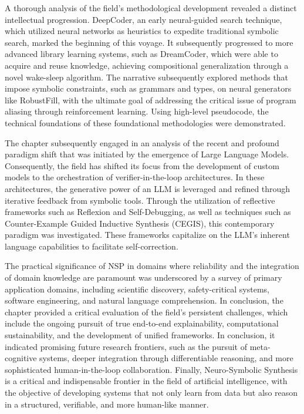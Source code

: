 \documentclass[12pt, a4paper]{report}
\begin{document}
A thorough analysis of the field's methodological development revealed a distinct intellectual progression. DeepCoder, an early neural-guided search technique, which utilized neural networks as heuristics to expedite traditional symbolic search, marked the beginning of this voyage. It subsequently progressed to more advanced library learning systems, such as DreamCoder, which were able to acquire and reuse knowledge, achieving compositional generalization through a novel wake-sleep algorithm. The narrative subsequently explored methods that impose symbolic constraints, such as grammars and types, on neural generators like RobustFill, with the ultimate goal of addressing the critical issue of program aliasing through reinforcement learning. Using high-level pseudocode, the technical foundations of these foundational methodologies were demonstrated.

The chapter subsequently engaged in an analysis of the recent and profound paradigm shift that was initiated by the emergence of Large Language Models. Consequently, the field has shifted its focus from the development of custom models to the orchestration of verifier-in-the-loop architectures. In these architectures, the generative power of an LLM is leveraged and refined through iterative feedback from symbolic tools. Through the utilization of reflective frameworks such as Reflexion and Self-Debugging, as well as techniques such as Counter-Example Guided Inductive Synthesis (CEGIS), this contemporary paradigm was investigated. These frameworks capitalize on the LLM's inherent language capabilities to facilitate self-correction.

The practical significance of NSP in domains where reliability and the integration of domain knowledge are paramount was underscored by a survey of primary application domains, including scientific discovery, safety-critical systems, software engineering, and natural language comprehension. In conclusion, the chapter provided a critical evaluation of the field's persistent challenges, which include the ongoing pursuit of true end-to-end explainability, computational sustainability, and the development of unified frameworks. In conclusion, it indicated promising future research frontiers, such as the pursuit of meta-cognitive systems, deeper integration through differentiable reasoning, and more sophisticated human-in-the-loop collaboration. Finally, Neuro-Symbolic Synthesis is a critical and indispensable frontier in the field of artificial intelligence, with the objective of developing systems that not only learn from data but also reason in a structured, verifiable, and more human-like manner.



\end{document}

